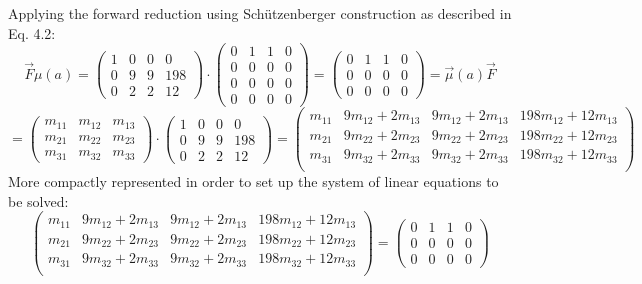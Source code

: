         Applying the forward reduction using Schützenberger construction as described in \autocite{Kiefer2013OnTC} Eq. 4.2:
        \[ \overrightarrow{F} \mu(a) = 
            \begin{pmatrix}
                1 & 0 & 0 & 0 \\
                0 & 9 & 9 & 198 \\
                0 & 2 & 2 & 12 
            \end{pmatrix} \cdot \begin{pmatrix}
                    0 & 1 & 1 & 0 \\
                    0 & 0 & 0 & 0 \\
                    0 & 0 & 0 & 0 \\
                    0 & 0 & 0 & 0
            \end{pmatrix} = \begin{pmatrix}
                0 & 1 & 1 & 0 \\
                0 & 0 & 0 & 0 \\
                0 & 0 & 0 & 0
            \end{pmatrix}  = \overrightarrow{\mu}(a) \overrightarrow{F} 
        \] 
        \[=  \begin{pmatrix}
                m_{11} & m_{12} & m_{13} \\
                m_{21} & m_{22} & m_{23} \\
                m_{31} & m_{32} & m_{33} 
            \end{pmatrix} \cdot \begin{pmatrix}
                1 & 0 & 0 & 0 \\
                0 & 9 & 9 & 198 \\
                0 & 2 & 2 & 12 
            \end{pmatrix} =
             \begin{pmatrix}
                m_{11} & 9m_{12}+2m_{13} & 9m_{12}+2m_{13} & 198m_{12}+12m_{13} \\
                m_{21} & 9m_{22}+2m_{23} & 9m_{22}+2m_{23} & 198m_{22}+12m_{23} \\
                m_{31} & 9m_{32}+2m_{33} & 9m_{32}+2m_{33} & 198m_{32}+12m_{33} \\
            \end{pmatrix} 
        \]
        More compactly represented in order to set up the system of linear equations to be solved:
        \[   \begin{pmatrix}
                m_{11} & 9m_{12}+2m_{13} & 9m_{12}+2m_{13} & 198m_{12}+12m_{13} \\
                m_{21} & 9m_{22}+2m_{23} & 9m_{22}+2m_{23} & 198m_{22}+12m_{23} \\
                m_{31} & 9m_{32}+2m_{33} & 9m_{32}+2m_{33} & 198m_{32}+12m_{33} \\
            \end{pmatrix}  = 
            \begin{pmatrix}
                0 & 1 & 1 & 0 \\
                0 & 0 & 0 & 0 \\
                0 & 0 & 0 & 0
            \end{pmatrix}
        \]
